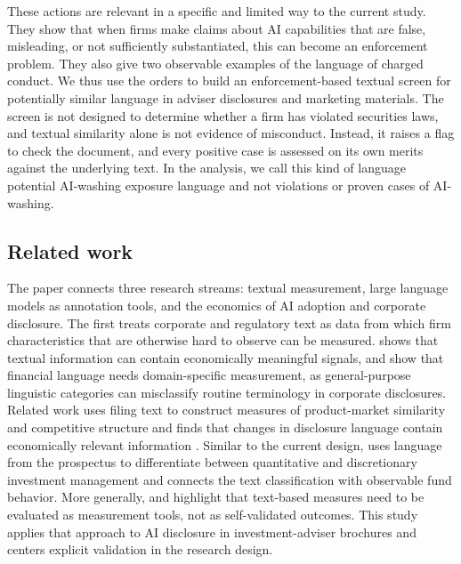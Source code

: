 \documentclass[utf8]{FrontiersinHarvard}
\begin{document}
These actions are relevant in a specific and limited way to the current study. They show that when firms make claims about AI capabilities that are false, misleading, or not sufficiently substantiated, this can become an enforcement problem. They also give two observable examples of the language of charged conduct. We thus use the orders to build an enforcement-based textual screen for potentially similar language in adviser disclosures and marketing materials. The screen is not designed to determine whether a firm has violated securities laws, and textual similarity alone is not evidence of misconduct. Instead, it raises a flag to check the document, and every positive case is assessed on its own merits against the underlying text. In the analysis, we call this kind of language potential AI-washing exposure language and not violations or proven cases of AI-washing.

\subsection{Related work}

The paper connects three research streams: textual measurement, large language models as annotation tools, and the economics of AI adoption and corporate disclosure. The first treats corporate and regulatory text as data from which firm characteristics that are otherwise hard to observe can be measured. \citet{tetlock2007} shows that textual information can contain economically meaningful signals, and \citet{loughran2011,loughran2016} show that financial language needs domain-specific measurement, as general-purpose linguistic categories can misclassify routine terminology in corporate disclosures. Related work uses filing text to construct measures of product-market similarity and competitive structure \citep{hoberg2016} and finds that changes in disclosure language contain economically relevant information \citep{cohenLazy2020}. Similar to the current design, \citet{abis2022} uses language from the prospectus to differentiate between quantitative and discretionary investment management and connects the text classification with observable fund behavior. More generally, \citet{grimmer2013} and \citet{gentzkow2019} highlight that text-based measures need to be evaluated as measurement tools, not as self-validated outcomes. This study applies that approach to AI disclosure in investment-adviser brochures and centers explicit validation in the research design.
\end{document}
